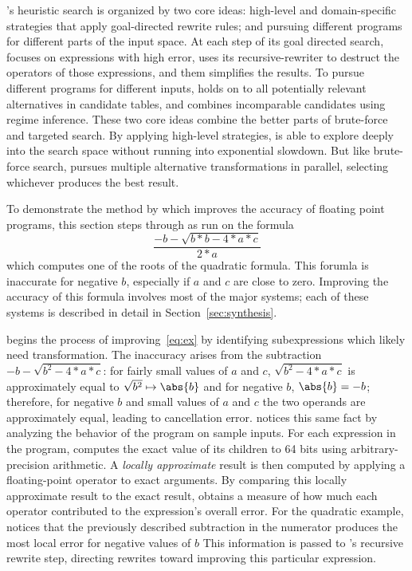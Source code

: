 \documentclass[paper.tex]{subfiles}
\begin{document}
\casio's heuristic search is organized by two core ideas: high-level
and domain-specific strategies that apply goal-directed rewrite rules;
and pursuing different programs for different parts of the input
space.  At each step of its goal directed search, \casio focuses on
expressions with high error, uses its recursive-rewriter to destruct
the operators of those expressions, and them simplifies the results.
To pursue different programs for different inputs, \casio holds on to
all potentially relevant alternatives in candidate tables, and combines
incomparable candidates using regime inference.  These two core ideas
combine the better parts of brute-force and targeted search.  By
applying high-level strategies, \casio is able to explore deeply into
the search space without running into exponential slowdown.  But like
brute-force search, \casio pursues multiple alternative
transformations in parallel, selecting whichever produces the best
result.

To demonstrate the method by which
  \casio improves the accuracy of floating point programs,
  this section steps through \casio as run on the formula
\begin{equation}\label{eq:ex}
  \frac{-b - \sqrt{b*b - 4*a*c}}
       {2*a}
\end{equation}
  which computes one of the roots of the quadratic formula.
This forumla is inaccurate for negative $b$,
  especially if $a$ and $c$ are close to zero.
Improving the accuracy of this formula
  involves most of the major systems;
  each of these systems is described in detail
  in Section~\ref{sec:synthesis}.

\casio begins the process of improving~\eqref{eq:ex}
  by identifying subexpressions
  which likely need transformation.
The inaccuracy arises from the subtraction $-b - \sqrt{b^2 - 4*a*c}$:
  for fairly small values of $a$ and $c$,
  $\sqrt{b^2 - 4*a*c}$ is approximately equal to $\sqrt{b^2} \mapsto \abs{b}$
  and for negative $b$, $\abs{b} = -b$;
  therefore, for negative $b$ and small values of $a$ and $c$
  the two operands are approximately equal,
  leading to cancellation error.
\casio notices this same fact
  by analyzing the behavior of the program on sample inputs.
For each expression in the program,
  \casio computes the exact value of its children to 64 bits
  using arbitrary-precision arithmetic.
A \emph{locally approximate} result is then computed
  by applying a floating-point operator to exact arguments.
By comparing this locally approximate result to the exact result,
  \casio obtains a measure of how much each operator
  contributed to the expression's overall error.
For the quadratic example,
  \casio notices that the previously described subtraction in the numerator 
  produces the most local error for negative values of $b$
This information is passed to \casio's recursive rewrite step,
  directing rewrites toward improving this particular expression.
\end{document}
